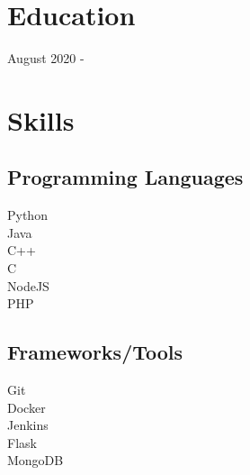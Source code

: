 \documentclass[]{deedy-resume-openfont}
\begin{document}
%
%

%
%



%
%

\begin{minipage}[t]{0.33\textwidth} 


\section{Education} 
August 2020 -  \\
\sectionsep


\section{Skills}
\subsection{Programming Languages}
\textbullet{}Python \\
\textbullet{} Java \\
\textbullet{} C++ \\
\textbullet{} C \\
\textbullet{} NodeJS \\
\textbullet{} PHP
\newline
\subsection{Frameworks/Tools}
\textbullet{}Git \\
\textbullet{}Docker \\
\textbullet{}Jenkins \\
\textbullet{}Flask \\
\textbullet{}MongoDB \\


\end{minipage}
\end{document}
